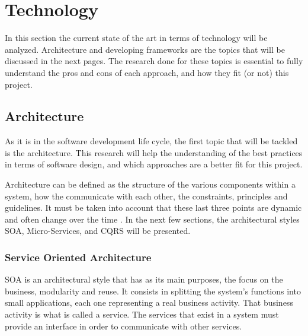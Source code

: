 \section{Technology}
\label{sec:StateOfTheArt_Technology}
In this section the current state of the art in terms of technology will be analyzed. Architecture and developing frameworks are the topics that will be discussed in the next pages. The research done for these topics is essential to fully understand the pros and cons of each approach, and how they fit (or not) this project.

\subsection{Architecture}
\label{sub:StateOfTheArt_Technology_Architecture}
As it is in the software development life cycle, the first topic that will be tackled is the architecture. This research will help the understanding of the best practices in terms of software design, and which approaches are a better fit for this project.
\par
Architecture can be defined as the structure of the various components within a system, how the communicate with each other, the constraints, principles and guidelines. It must be taken into account that these last three points are dynamic and often change over the time \parencite{mappingServicesToActivities}. In the next few sections, the architectural styles \gls{SOA}, Micro-Services, and \gls{CQRS} will be presented.

\subsubsection{Service Oriented Architecture}
\gls{SOA} is an architectural style that has as its main purposes, the focus on the business, modularity and reuse. It consists in splitting the system's functions into small applications, each one representing a real business activity. That business activity is what is called a service. The services that exist in a system must provide an interface in order to communicate with other services.
\par

